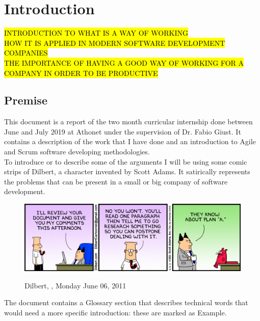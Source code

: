 \chapter{Introduction}
\label{introduction}

%
%
%
%

\hl{INTRODUCTION TO WHAT IS A WAY OF WORKING\\HOW IT IS APPLIED IN MODERN SOFTWARE DEVELOPMENT COMPANIES\\THE IMPORTANCE OF HAVING A GOOD WAY OF WORKING FOR A COMPANY IN ORDER TO BE PRODUCTIVE}

\section{Premise}
	This document is a report of the two month curricular internship done between June and July 2019 at Athonet under the supervision of Dr. Fabio Giust.
	It contains a description of the work that I have done and an introduction to Agile and Scrum software developing methodologies.\\
	To introduce or to describe some of the arguments I will be using some comic strips of Dilbert, a character invented by Scott Adams.
	It satirically represents the problems that can be present in a small or big company of software development.
	\begin{figure}[H]
		\centering
		\includegraphics[width=1\textwidth]{resources/Dissertate}\\
		\caption[Dilbert, ]{Dilbert, , Monday June 06, 2011}
	\end{figure}
	The document contains a Glossary section that describes technical words that would need a more specific introduction: these are marked as \gls{Example}.\\
	
